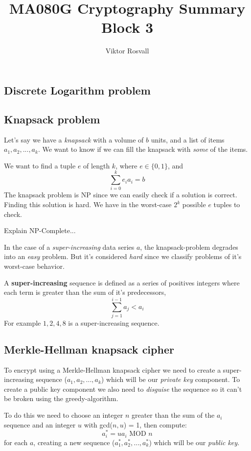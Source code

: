 \documentclass[12pt]{article}
\title{MA080G Cryptography Summary Block 3}
\author{Viktor Rosvall}
\begin{document}
	\maketitle
	
	
	\subsection*{Discrete Logarithm problem}
	
	
	\subsection*{Knapsack problem \cite{knapsack-problem}}
	Let's say we have a \textit{knapsack} with a volume of $b$ units, and a list of items $a_1, a_2,...,a_k$. We want to know if we can fill the knapsack with \textit{some} of the items. 
	
	We want to find a tuple $e$ of length $k$, where $e \in \{0,1\}$, and 
	$$
	\sum_{i = 0}^{k}e_ia_i = b
	$$
	The knapsack problem is NP since we can easily check if a solution is correct. Finding this solution is hard. We have in the worst-case $2^k$ possible $e$ tuples to check. 
	
	Explain NP-Complete...
	
	In the case of a \textit{super-increasing} data series $a$, the knapsack-problem degrades into an \textit{easy} problem. But it's considered \textit{hard} since we classify problems of it's worst-case behavior. 
	
	A \textbf{super-increasing} sequence is defined as a series of positives integers where each term is greater than the sum of it's predecessors, 
	$$
	\sum_{j=1}^{i-1}a_j<a_i
	$$
	For example $1,2,4,8$ is a super-increasing sequence.
	
	
	\subsection*{Merkle-Hellman knapsack cipher \cite{knapsack-cipher}}
	To encrypt using a Merkle-Hellman knapsack cipher we need to create a super-increasing sequence ($a_1,a_2,...,a_k$) which will be our \textit{private key} component. To create a public key component we also need to \textit{disguise} the sequence so it can't be broken using the greedy-algorithm. 
	
	To do this we need to choose an integer $n$ greater than the sum of the $a_i$ sequence and an integer $u$ with gcd($n,u$) = 1, then compute:
	$$
	a_i^* = ua_i \text{ MOD } n
	$$
	for each $a$, creating a new sequence ($a_1^*,a_2^*,...,a_k^*$) which will be our \textit{public key}.
	
\end{document}

